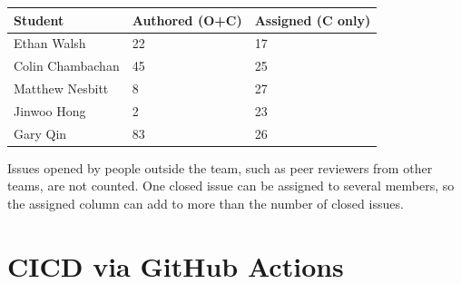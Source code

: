 \documentclass{article}
\begin{document}
\begin{table}[H]
\centering
\begin{tabular}{lll}
\toprule
\textbf{Student} & \textbf{Authored (O+C)} & \textbf{Assigned (C only)}\\
\midrule
Ethan Walsh & 22 & 17 \\
Colin Chambachan & 45 & 25 \\
Matthew Nesbitt & 8 & 27 \\
Jinwoo Hong & 2 & 23 \\
Gary Qin & 83 & 26 \\
\bottomrule
\end{tabular}
\end{table}

Issues opened by people outside the team, such as peer reviewers from other
teams, are not counted. One closed issue can be assigned to several members, so
the assigned column can add to more than the number of closed issues.

\section{CICD via GitHub Actions}
\end{document}
